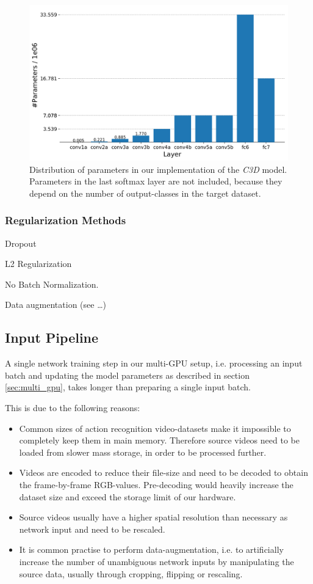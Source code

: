 \begin{figure}[H]
    \centering
    \includegraphics[width=\textwidth]{img_approach/parameters_plot}
    \caption{Distribution of parameters in our implementation of the \textit{C3D} model. Parameters in the last softmax layer are not included, because they depend on the number of output-classes in the target dataset.}
    \label{fig:parameters_plot}
\end{figure}

\subsubsection{Regularization Methods}
Dropout

L2 Regularization

No Batch Normalization.

Data augmentation (see \dots)

\subsection{Input Pipeline}

A single network training step in our multi-GPU setup, i.e. processing an input batch and updating the model parameters as described in section \ref{sec:multi_gpu}, takes longer than preparing a single input batch.

This is due to the following reasons:
\begin{itemize}
    \item 
    Common sizes of action recognition video-datasets make it impossible to completely keep them in main memory.
    Therefore source videos need to be loaded from slower mass storage, in order to be processed further.
    \item 
    Videos are encoded to reduce their file-size and need to be decoded to obtain the frame-by-frame RGB-values.
    Pre-decoding would heavily increase the dataset size and exceed the storage limit of our hardware.
    \item
    Source videos usually have a higher spatial resolution than necessary as network input and need to be rescaled.
    \item
    It is common practise to perform data-augmentation, i.e. to artificially increase the number of unambiguous network inputs by manipulating the source data, usually through cropping, flipping or rescaling.
\end{itemize}

